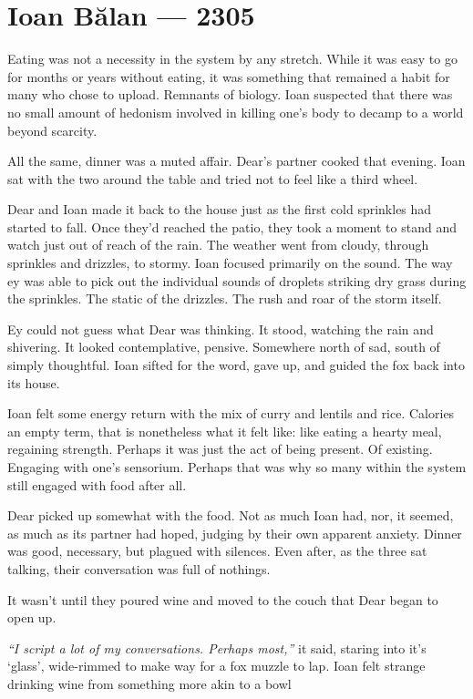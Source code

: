 \hypertarget{ioan-bux103lan-2305}{%
\chapter*{Ioan Bălan — 2305}\label{ioan-bux103lan-2305}}

Eating was not a necessity in the system by any stretch. While it was easy to go for months or years without eating, it was something that remained a habit for many who chose to upload. Remnants of biology. Ioan suspected that there was no small amount of hedonism involved in killing one's body to decamp to a world beyond scarcity.

All the same, dinner was a muted affair. Dear's partner cooked that evening. Ioan sat with the two around the table and tried not to feel like a third wheel.

Dear and Ioan made it back to the house just as the first cold sprinkles had started to fall. Once they'd reached the patio, they took a moment to stand and watch just out of reach of the rain. The weather went from cloudy, through sprinkles and drizzles, to stormy. Ioan focused primarily on the sound. The way ey was able to pick out the individual sounds of droplets striking dry grass during the sprinkles. The static of the drizzles. The rush and roar of the storm itself.

Ey could not guess what Dear was thinking. It stood, watching the rain and shivering. It looked contemplative, pensive. Somewhere north of sad, south of simply thoughtful. Ioan sifted for the word, gave up, and guided the fox back into its house.

Ioan felt some energy return with the mix of curry and lentils and rice. Calories an empty term, that is nonetheless what it felt like: like eating a hearty meal, regaining strength. Perhaps it was just the act of being present. Of existing. Engaging with one's sensorium. Perhaps that was why so many within the system still engaged with food after all.

Dear picked up somewhat with the food. Not as much Ioan had, nor, it seemed, as much as its partner had hoped, judging by their own apparent anxiety. Dinner was good, necessary, but plagued with silences. Even after, as the three sat talking, their conversation was full of nothings.

It wasn't until they poured wine and moved to the couch that Dear began to open up.

\emph{``I script a lot of my conversations. Perhaps most,''} it said, staring into it's `glass', wide-rimmed to make way for a fox muzzle to lap. Ioan felt strange drinking wine from something more akin to a bowl

